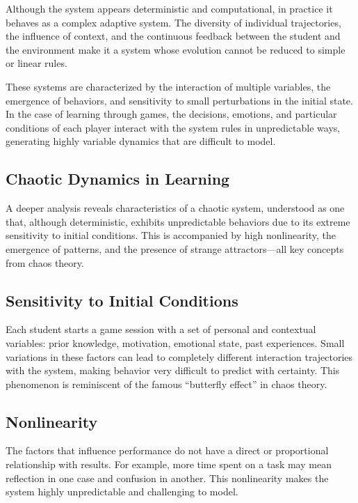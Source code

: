\documentclass{article}
\begin{document}
Although the system appears deterministic and computational, in practice 
it behaves as a complex adaptive system. The diversity of individual 
trajectories, the influence of context, and the continuous feedback 
between the student and the environment make it a system whose evolution 
cannot be reduced to simple or linear rules.

These systems are characterized by the interaction of multiple variables, 
the emergence of behaviors, and sensitivity to small perturbations in the 
initial state. In the case of learning through games, the decisions, 
emotions, and particular conditions of each player interact with the 
system rules in unpredictable ways, generating highly variable dynamics 
that are difficult to model.

\subsection*{Chaotic Dynamics in Learning}

A deeper analysis reveals characteristics of a chaotic system, understood 
as one that, although deterministic, exhibits unpredictable behaviors due 
to its extreme sensitivity to initial conditions. This is accompanied by 
high nonlinearity, the emergence of patterns, and the presence of strange 
attractors—all key concepts from chaos theory.

\subsection*{Sensitivity to Initial Conditions}

Each student starts a game session with a set of personal and contextual 
variables: prior knowledge, motivation, emotional state, past experiences. 
Small variations in these factors can lead to completely different 
interaction trajectories with the system, making behavior very difficult 
to predict with certainty. This phenomenon is reminiscent of the famous 
``butterfly effect'' in chaos theory.

\subsection*{Nonlinearity}

The factors that influence performance do not have a direct or 
proportional relationship with results. For example, more time spent on a 
task may mean reflection in one case and confusion in another. This 
nonlinearity makes the system highly unpredictable and challenging to 
model.
\end{document}
